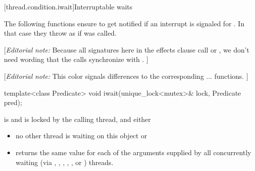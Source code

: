 






{\color{insertcolor}

[thread.condition.iwait]{Interruptable waits}

The following functions ensure to get notified
if an interrupt is signaled for .
In that case they throw  as if
 was called.

{\color{blue}
[{\itshape{}Editorial note:} Because all signatures here in the effects clause call
         or , we don't need wording
        that the calls synchronize with . ]
}

{\color{blue}
[{\itshape{}Editorial note:} {\color{diffcolor}This color signals differences to the corresponding ...\tcode{()} functions.} ]
}

%
\begin{itemdecl}
template<class Predicate>
  void iwait(unique_lock<mutex>& lock, Predicate pred);
\end{itemdecl}
\begin{itemdescr}
 \pnum \requires {} is  and  is
        locked by the calling thread, and either

        \begin{itemize}
         \item no other thread is waiting on this  object or
         \item {} returns the same value for each of the 
                arguments supplied by all concurrently waiting (via ,
                , ,
                {\color{insertcolor} , , or }) threads.
        \end{itemize}


\end{itemdescr}}
